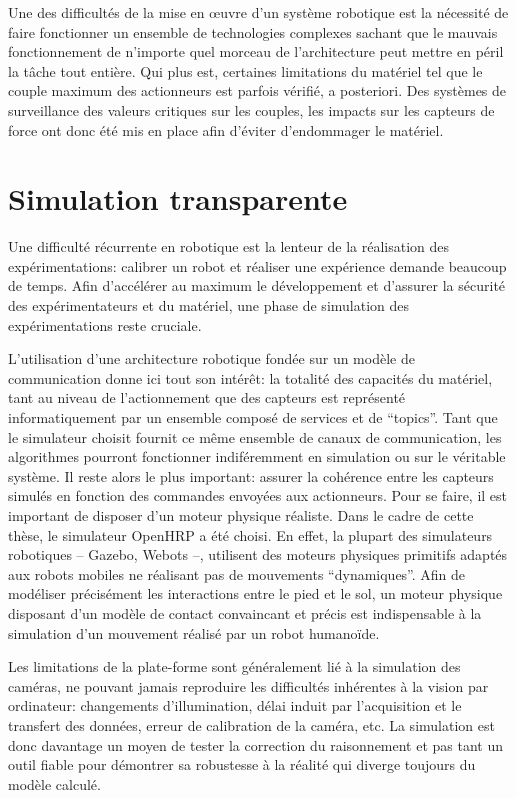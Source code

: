 Une des difficultés de la mise en \oe uvre d'un système robotique est
la nécessité de faire fonctionner un ensemble de technologies
complexes sachant que le mauvais fonctionnement de n'importe quel
morceau de l'architecture peut mettre en péril la tâche tout
entière. Qui plus est, certaines limitations du matériel tel que le
couple maximum des actionneurs est parfois vérifié, a posteriori. Des
systèmes de surveillance des valeurs critiques sur les couples, les
impacts sur les capteurs de force ont donc été mis en place afin
d'éviter d'endommager le matériel.


\section{Simulation transparente}


Une difficulté récurrente en robotique est la lenteur de la
réalisation des expérimentations: calibrer un robot et réaliser une
expérience demande beaucoup de temps. Afin d'accélérer au maximum le
développement et d'assurer la sécurité des expérimentateurs et du
matériel, une phase de simulation des expérimentations reste cruciale.


L'utilisation d'une architecture robotique fondée sur un modèle de
communication donne ici tout son intérêt: la totalité des capacités du
matériel, tant au niveau de l'actionnement que des capteurs est
représenté informatiquement par un ensemble composé de services et de
``topics''. Tant que le simulateur choisit fournit ce même ensemble de
canaux de communication, les algorithmes pourront fonctionner
indiféremment en simulation ou sur le véritable système. Il reste
alors le plus important: assurer la cohérence entre les capteurs
simulés en fonction des commandes envoyées aux actionneurs. Pour se
faire, il est important de disposer d'un moteur physique
réaliste. Dans le cadre de cette thèse, le simulateur OpenHRP a été
choisi. En effet, la plupart des simulateurs robotiques -- Gazebo,
Webots --, utilisent des moteurs physiques primitifs adaptés aux
robots mobiles ne réalisant pas de mouvements ``dynamiques''. Afin de
modéliser précisément les interactions entre le pied et le sol, un
moteur physique disposant d'un modèle de contact convaincant et précis
est indispensable à la simulation d'un mouvement réalisé par un robot
humanoïde.


Les limitations de la plate-forme sont généralement lié à la
simulation des caméras, ne pouvant jamais reproduire les difficultés
inhérentes à la vision par ordinateur: changements d'illumination,
délai induit par l'acquisition et le transfert des données, erreur de
calibration de la caméra, etc. La simulation est donc davantage un
moyen de tester la correction du raisonnement et pas tant un outil
fiable pour démontrer sa robustesse à la réalité qui diverge toujours
du modèle calculé.



